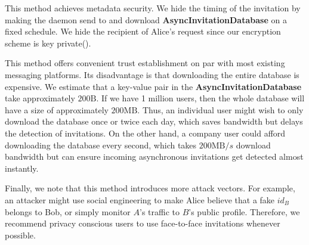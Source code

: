 This method achieves metadata security. We hide the timing of the invitation by making the daemon send to and download \textbf{AsyncInvitationDatabase} on a fixed schedule. We hide the recipient of Alice's request since our encryption scheme is key private(). 

This method offers convenient trust establishment on par with most existing messaging platforms. Its disadvantage is that downloading the entire database is expensive. We estimate that a key-value pair in the \textbf{AsyncInvitationDatabase} take approximately $200\text{B}$. If we have 1 million users, then the whole database will have a size of approximately $200\text{MB}$. Thus, an individual user might wish to only download the database once or twice each day, which saves bandwidth but delays the detection of invitations. On the other hand, a company user could afford downloading the database every second, which takes $200\text{MB}/s$ download bandwidth but can ensure incoming asynchronous invitations get detected almost instantly.

Finally, we note that this method introduces more attack vectors. For example, an attacker might use social engineering to make Alice believe that a fake $id_B$ belongs to Bob, or simply monitor $A$'s traffic to $B$'s public profile. Therefore, we recommend privacy conscious users to use face-to-face invitations whenever possible.